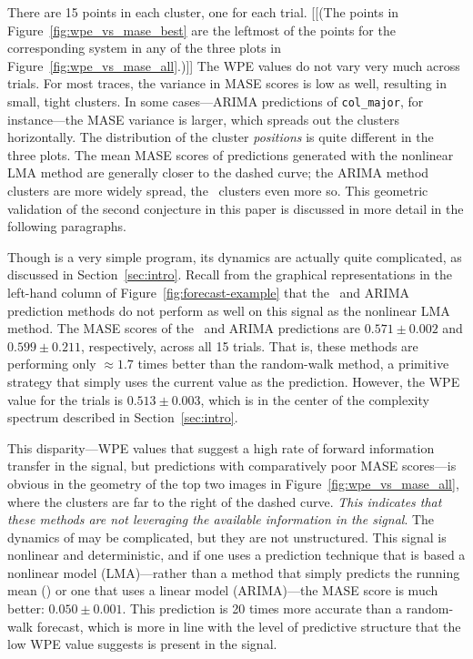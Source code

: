 There are 15 points in each cluster, one for each trial.  [[(The
    points in Figure~\ref{fig:wpe_vs_mase_best} are the leftmost of
    the points for the corresponding system in any of the three plots
    in Figure~\ref{fig:wpe_vs_mase_all}.)]]  The WPE values do not
vary very much across trials.  For most traces, the variance in MASE
scores is low as well, resulting in small, tight clusters.  In some
cases---ARIMA predictions of {\tt col\_major}, for instance---the MASE
variance is larger, which spreads out the clusters horizontally.  The
distribution of the cluster \emph{positions} is quite different in the
three plots.  The mean MASE scores of predictions generated with the
nonlinear LMA method are generally closer to the dashed curve; the
ARIMA method clusters are more widely spread, the \naive ~clusters
even more so.  This geometric validation of the second conjecture in
this paper is discussed in more detail in the following paragraphs.

Though \col is a very simple program, its dynamics are actually quite
complicated, as discussed in Section~\ref{sec:intro}.  Recall from the
graphical representations in the left-hand column of
Figure~\ref{fig:forecast-example} that the \naive ~and ARIMA
prediction methods do not perform as well on this signal as the
nonlinear LMA method.  The MASE scores of the \naive ~and ARIMA
predictions are $0.571 \pm 0.002$ and $0.599 \pm 0.211$, respectively,
across all 15 trials.  That is, these methods are performing only
$\approx 1.7$ times better than the random-walk method, a primitive
strategy that simply uses the current value as the prediction.
However, the WPE value for the \col trials is $0.513 \pm 0.003$, which
is in the center of the complexity spectrum described in
Section~\ref{sec:intro}.

This disparity---WPE values that suggest a high rate of forward
information transfer in the signal, but predictions with comparatively
poor MASE scores---is obvious in the geometry of the top two images in
Figure~\ref{fig:wpe_vs_mase_all}, where the \col clusters are far to
the right of the dashed curve.  \emph{This indicates that these
  methods are not leveraging the available information in the signal}.
The dynamics of \col may be complicated, but they are not
unstructured.  This signal is nonlinear and
deterministic\cite{mytkowicz09}, and if one uses a prediction
technique that is based a nonlinear model (LMA)---rather than a method
that simply predicts the running mean (\naive) or one that uses a
linear model (ARIMA)---the MASE score is much better: $0.050 \pm
0.001$.  This prediction is 20 times more accurate than a random-walk
forecast, which is more in line with the level of predictive structure
that the low WPE value suggests is present in the signal.

